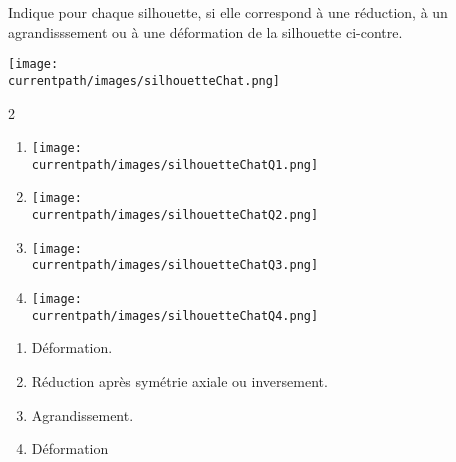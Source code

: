 \begin{exercice*}
    \phantom{rrr}

    \begin{minipage}{0.7\linewidth}
    Indique pour chaque silhouette, si elle correspond à une réduction, à un agrandisssement ou à une déformation de la silhouette ci-contre.
    \end{minipage}
    \makeatletter
    \newcommand{\scaleGunDixHuit}{0.3}
    \makeatother
    \begin{minipage}{0.25\linewidth}
        \texttt{[image: \\currentpath/images/silhouetteChat.png]}
    \end{minipage}

    \begin{minipage}{1\linewidth}
    \begin{center}
        \begin{multicols}2   
            \begin{enumerate}
                \item \phantom{rrr} 
                
                \texttt{[image: \\currentpath/images/silhouetteChatQ1.png]}
                \item \phantom{rrr} 
                
                \texttt{[image: \\currentpath/images/silhouetteChatQ2.png]}
                \item \phantom{rrr} 
                
                \texttt{[image: \\currentpath/images/silhouetteChatQ3.png]}
                \item \phantom{rrr} 
                
                \texttt{[image: \\currentpath/images/silhouetteChatQ4.png]}
            \end{enumerate}
        \end{multicols}
    \end{center}
    \end{minipage}
    
\end{exercice*}
\begin{corrige}

    \begin{enumerate}
        \item Déformation.                
        \item Réduction après symétrie axiale ou inversement.
        \item Agrandissement.
        \item Déformation                
    \end{enumerate}
\end{corrige}

